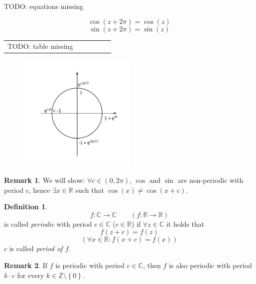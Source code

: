 \documentclass[a4paper,landscape,twocolumn]{article}
\theoremstyle{definition}
\newtheorem{defi}{Definition}
\newtheorem{rem}{Remark}
\newcommand\set[1]{\left\{#1\right\}}
\begin{document}
TODO: equations missing

\[ \cos(z + 2\pi) = \cos(z) \]
\[ \sin(z + 2\pi) = \sin(z) \]

\begin{table}
  \begin{tabular}{cccccc}
TODO: table missing &&&&&
  \end{tabular}
\end{table}

\begin{figure}[!h]
  \begin{center}
    \includegraphics[width=0.5\textwidth]{img/trigonometric-periodicity.pdf}
  \end{center}
\end{figure}

\begin{rem}
  We will show: $\forall c \in (0, 2\pi)$, $\cos$ and $\sin$ are non-periodic with period $c$,
  hence $\exists x \in \mathbb R$ such that $\cos(x) \neq \cos(x + c)$.
\end{rem}

\begin{defi}
  \[ f: \mathbb C \to \mathbb C \qquad (f: \mathbb R \to \mathbb R) \]
  is called \emph{periodic} with period $c \in \mathbb C$ ($c \in \mathbb R$)
  if $\forall z \in \mathbb C$ it holds that
  \[ f(z + c) = f(z) \]
  \[ (\forall x \in \mathbb R: f(x + c) = f(x)) \]
  $c$ is called \emph{period of $f$}.
\end{defi}

\begin{rem}
  If $f$ is periodic with period $c \in \mathbb C$,
  then $f$ is also periodic with period $k \cdot c$ for every $k \in \mathbb Z \setminus \set{0}$.
\end{rem}
\end{document}
